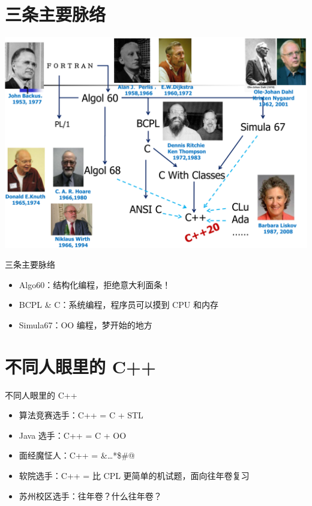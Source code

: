 \documentclass[10pt,aspectratio=169,mathserif]{beamer}
\begin{document}
\section{三条主要脉络}
\begin{frame}
	\begin{center}
		\includegraphics[height=\textheight]{image/c++_history.png}
	\end{center}
\end{frame}

\begin{frame}{三条主要脉络}
	\begin{itemize}
		\item
		      Algo60：结构化编程，拒绝意大利面条！
		\item
		      BCPL \& C：系统编程，程序员可以摸到 CPU 和内存
		\item
		      Simula67：OO 编程，梦开始的地方
	\end{itemize}
\end{frame}



\section{不同人眼里的 C++}

\begin{frame}{不同人眼里的 C++}

	\begin{itemize}
		\item
		      算法竞赛选手：C++ = C + STL
		\item
		      Java 选手：C++ = C + OO
		\item
		      面经魔怔人：C++ = \&\ldots{}*\$\#@
		\item
		      软院选手：C++ = 比 CPL 更简单的机试题，面向往年卷复习
		\item
		      苏州校区选手：往年卷？什么往年卷？
	\end{itemize}

\end{frame}
\end{document}
